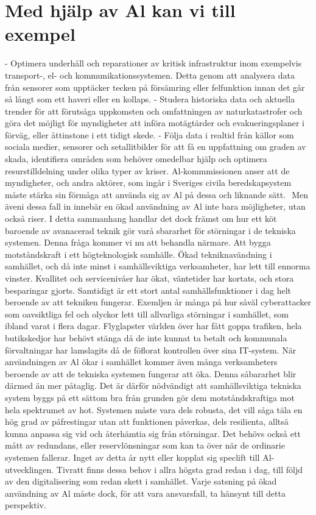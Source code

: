 {{{{{{{\section*{Med hjälp av Al kan vi till exempel}
- Optimera underhåll och reparationer av kritisk infrastruktur inom exempelvis transport-, el- och kommunikationssystemen. Detta genom att analysera data från sensorer som upptäcker tecken på försämring eller felfunktion innan det går så långt som ett haveri eller en kollaps.
- Studera historiska data och aktuella trender för att förutsåga uppkomsten och omfattningen av naturkatastrofer och göra det möjligt för myndigheter att införa motägtärder och evakueringsplaner i förväg, eller åttinstone i ett tidigt skede.
- Följa data i realtid från källor som sociala medier, sensorer och setallitbilder för att få en uppfattning om graden av skada, identifiera områden som behöver omedelbar hjälp och optimera resurstilldelning under olika typer av kriser.
Al-kommmissionen anser att de myndigheter, och andra aktörer, som ingår i Sveriges civila beredskapsystem måste stärka sin förmåga att använda sig av Al på dessa och liknande sätt. \({ }^{}\) Men äveni dessa fall in innebär en ökad användning av Al inte bara möjligheter, utan också riser. I detta sammanhang handlar det dock främst om hur ett köt baroende av avanacerad teknik gör varå sbararhet för störningar i de tekniska systemen. Denna fråga kommer vi nu att behandla närmare.
Att bygga motståndskraft i ett högteknologisk samhälle.
Ökad tekniknavändning i samhället, och då inte minst i samhällsviktiga verksamheter, har lett till ennorma vinster. Kvallitet och servicenivåer har ökat, väntetider har kortats, och stora besparingar gjorts. Samtidigt är ett stort antal samhällsfunktioner i dag helt beroende av att tekniken fungerar. Exemljen år många på hur såväl cyberattacker som oavsiktliga fel och olyckor lett till allvarliga störningar i samhället, som ibland varat i flera dagar. Flyglapster världen över har fått goppa trafiken, hela butikskedjor har behövt stänga då de inte kunnat ta betalt och kommunala förvaltningar har lamslagits då de föflorat kontrollen över sina IT-system.
När användningen av Al ökar i samhället kommer även många verksamheters beroende av att de tekniska systemen fungerar att öka. Denna såbararhet blir därmed än mer påtaglig. Det är därför nödvändigt att samhällsviktiga tekniska system byggs på ett sättom bra från grunden gör dem motståndskraftiga mot hela spektrumet av hot. Systemen måste vara dels robusta, det vill såga täla en hög grad av påfrestingar utan att funktionen påverkas, dels resilienta, alltsä kunna anpassa sig vid och återhämtia sig från störningar. Det behövs också ett mått av redundans, eller reservlönsningar som kan ta över när de ordinarie systemen fallerar. Inget av detta år nytt eller kopplat sig speclift till Al-utvecklingen. Tivratt finns dessa behov i allra högsta grad redan i dag, till följd av den digitalisering som redan skett i samhället. Varje satsning på ökad användning av Al måste dock, för att vara ansvarsfall, ta hänsynt till detta perspektiv.
}}}}}}}
